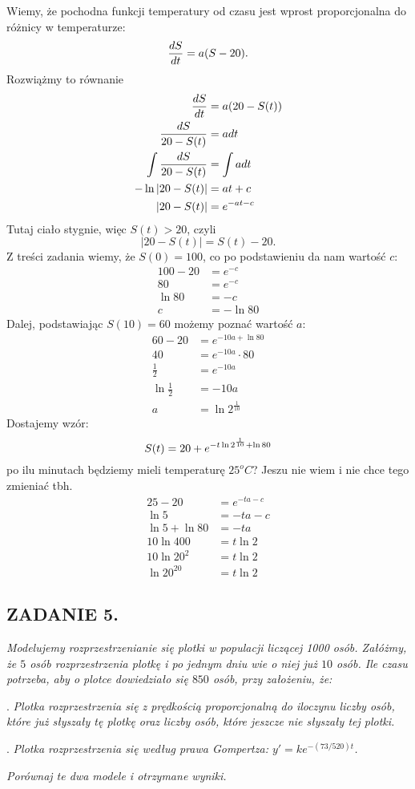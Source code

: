\documentclass{article}
\begin{document}
Wiemy, że pochodna funkcji temperatury od czasu jest wprost proporcjonalna do różnicy w temperaturze:
$${dS\over dt}=a(S-20).$$
Rozwiążmy to równanie
\begin{align*}
    {dS\over dt}&=a(20-S(t))\\
    {dS\over 20-S(t)}&=adt\\
    \int {dS\over 20-S(t)}&=\int adt\\
    -\ln|20-S(t)|&=at+c\\
    |20-S(t)|&=e^{-at-c}
\end{align*}
Tutaj ciało stygnie, więc $S(t)>20$, czyli
$$|20-S(t)|=S(t)-20.$$
Z treści zadania wiemy, że $S(0)=100$, co po podstawieniu da nam wartość $c$:
\begin{align*}
    100-20&=e^{-c}\\
    80&=e^{-c}\\
    \ln80&=-c\\
    c&=-\ln80
\end{align*}
Dalej, podstawiając $S(10)=60$ możemy poznać wartość $a$:
\begin{align*}
    60-20&=e^{-10a+\ln80}\\
    40&=e^{-10a}\cdot 80\\
    \frac12&=e^{-10a}\\
    \ln\frac12&=-10a\\
    a&=\ln2^{\frac1{10}}
\end{align*}
Dostajemy wzór:
$$S(t)=20+e^{-t\ln2^{1\over10}+\ln80}$$
po ilu minutach będziemy mieli temperaturę $25^oC$? Jeszu nie wiem i nie chce tego zmieniać tbh.
\begin{align*}
    25-20&=e^{-ta-c}\\
    \ln5&=-ta-c\\
    \ln5+\ln80&=-ta\\
    10\ln400&=t\ln2\\
    10\ln20^2&=t\ln2\\
    \ln20^{20}&=t\ln2
\end{align*}

\subsection*{ZADANIE 5.}
\emph{Modelujemy rozprzestrzenianie się plotki w populacji liczącej 1000 osób. Załóżmy, że $5$ osób rozprzestrzenia plotkę i po jednym dniu wie o niej już $10$ osób. Ile czasu potrzeba, aby o plotce dowiedziało się $850$ osób, przy założeniu, że:}

. \emph{Plotka rozprzestrzenia się z prędkością proporcjonalną do iloczynu liczby osób, które już słyszały tę plotkę oraz liczby osób, które jeszcze nie słyszały tej plotki.}

. \emph{Plotka rozprzestrzenia się według prawa Gompertza: $y'=ke^{-(73/520)t}$.}

\emph{Porównaj te dwa modele i otrzymane wyniki.}
\end{document}
